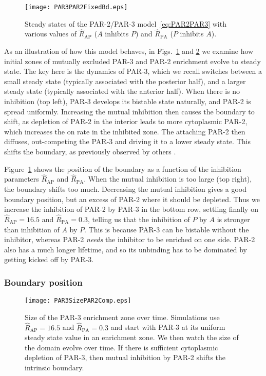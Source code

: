 \documentclass[11pt]{article}
\newcommand{\6}[1]{#1_{\text{6}}}
\newcommand{\3}[1]{#1_{\text{3}}}
\begin{document}
\begin{figure}
\centering
\texttt{[image: PAR3PAR2FixedBd.eps]}
\caption{\label{fig:P32FixBd}Steady states of the PAR-2/PAR-3 model\ \eqref{eq:PAR2PAR3} with various values of $\hat R_\text{AP}$ ($A$ inhibits $P$) and $\hat R_\text{PA}$ ($P$ inhibits $A$).}
\end{figure}

As an illustration of how this model behaves, in Figs.\ \ref{fig:P32FixBd} and \ref{fig:P32FixBdEq} we examine how initial zones of mutually excluded PAR-3 and PAR-2 enrichment evolve to steady state. The key here is the dynamics of PAR-3, which we recall switches between a small steady state (typically associated with the posterior half), and a larger steady state (typically associated with the anterior half). When there is no inhibition (top left), PAR-3 develops its bistable state naturally, and PAR-2 is spread uniformly. Increasing the mutual inhibition then causes the boundary to shift, as depletion of PAR-2 in the interior leads to more cytoplasmic PAR-2, which increases the on rate in the inhibited zone. The attaching PAR-2 then diffuses, out-competing the PAR-3 and driving it to a lower steady state. This shifts the boundary, as previously observed by others \cite{goehring2011polarization}. 

Figure\ \ref{fig:P32FixBd} shows the position of the boundary as a function of the inhibition parameters $\hat R_\text{AP}$ and $\hat R_\text{PA}$. When the mutual inhibition is too large (top right), the boundary shifts too much. Decreasing the mutual inhibition gives a good boundary position, but an excess of PAR-2 where it should be depleted. Thus we increase the inhibition of PAR-2 by PAR-3 in the bottom row, settling finally on $\hat R_\text{AP}=16.5$ and $\hat R_\text{PA}=0.3$, telling us that the inhibition of $P$ by $A$ is stronger than inhibition of $A$ by $P$. This is because PAR-3 can be bistable without the inhibitor, whereas PAR-2 \emph{needs} the inhibitor to be enriched on one side. PAR-2 also has a much longer lifetime, and so its unbinding has to be dominated by getting kicked off by PAR-3. 

\subsubsection{Boundary position}

\begin{figure}
\centering
\texttt{[image: PAR3SizePAR2Comp.eps]}
\caption{\label{fig:P32FixBdEq}Size of the PAR-3 enrichment zone over time. Simulations use $\hat R_\text{AP}=16.5$ and $\hat R_\text{PA}=0.3$ and start with PAR-3 at its uniform steady state value in an enrichment zone. We then watch the size of the domain evolve over time. If there is sufficient cytoplasmic depletion of PAR-3, then mutual inhibition by PAR-2 shifts the intrinsic boundary.}
\end{figure}
\end{document}
